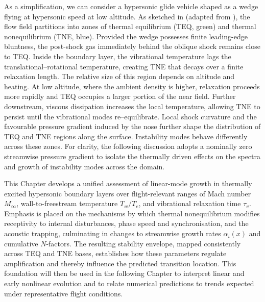 As a simplification, we can consider a hypersonic glide vehicle shaped as a wedge flying at hypersonic speed at low altitude. As sketched in  (adapted from \citet{williams2021}), the flow field partitions into zones of thermal equilibrium (\gls{TEQ}, green) and thermal nonequilibrium (\gls{TNE}, blue). Provided the wedge possesses finite leading-edge bluntness, the post-shock gas immediately behind the oblique shock remains close to \gls{TEQ}. Inside the boundary layer, the vibrational temperature lags the translational–rotational temperature, creating \gls{TNE} that decays over a finite relaxation length. The relative size of this region depends on altitude and heating. At low altitude, where the ambient density is higher, relaxation proceeds more rapidly and \gls{TEQ} occupies a larger portion of the near field. Further downstream, viscous dissipation increases the local temperature, allowing \gls{TNE} to persist until the vibrational modes re--equilibrate. Local shock curvature and the favourable pressure gradient induced by the nose further shape the distribution of \gls{TEQ} and \gls{TNE} regions along the surface. Instability modes behave differently across these zones. For clarity, the following discussion adopts a nominally zero streamwise pressure gradient to isolate the thermally driven effects on the spectra and growth of instability modes across the domain.

\begin{figure}[t]
    \centering
    \fontsize{8}{9}\selectfont
    \label{figure:wedgeflow}
\end{figure}

This Chapter develops a unified assessment of linear-mode growth in thermally excited hypersonic boundary layers over flight-relevant ranges of Mach number $M_\infty$, wall-to-freestream temperature $T_w/T_e$, and vibrational relaxation time $\tau_v$. Emphasis is placed on the mechanisms by which thermal nonequilibrium modifies receptivity to internal disturbances, phase speed and synchronisation, and the acoustic trapping, culminating in changes to streamwise growth rates $\alpha_i(x)$ and cumulative $N$-factors. The resulting stability envelope, mapped consistently across \gls{TEQ} and \gls{TNE} bases, establishes how these parameters regulate amplification and thereby influence the predicted transition location. This foundation will then be used in the following Chapter to interpret linear and early nonlinear evolution and to relate numerical predictions to trends expected under representative flight conditions.



